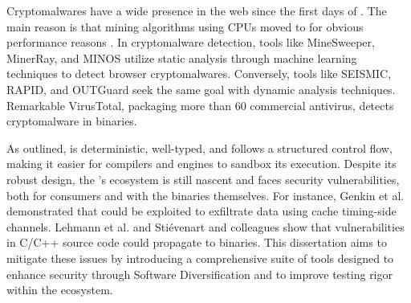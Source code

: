  Cryptomalwares have a wide presence in the web since the first days of \wasm.
The main reason is that mining algorithms using CPUs moved to \wasm for obvious performance reasons \cite{musch2019new}. 
In cryptomalware detection, tools like MineSweeper\cite{Minesweeper}, MinerRay\cite{MinerRay}, and MINOS\cite{MINOS} utilize static analysis through machine learning techniques to detect browser cryptomalwares. 
Conversely, tools like SEISMIC\cite{SEISMIC}, RAPID\cite{RAPID}, and OUTGuard\cite{outguard} seek the same goal with dynamic analysis techniques.
Remarkable VirusTotal, packaging more than 60 commercial antivirus, detects cryptomalware in \wasm binaries.






As outlined, \Wasm is deterministic, well-typed, and follows a structured control flow, making it easier for compilers and engines to sandbox its execution\cite{WebAssemblySecurity}. 
Despite its robust design, the \Wasm's ecosystem is still nascent and faces security vulnerabilities, both for \Wasm consumers and with the \Wasm binaries themselves. 
For instance, Genkin et al. demonstrated that \Wasm could be exploited to exfiltrate data using cache timing-side channels\cite{Genkin2018DrivebyKC}. 
Lehmann et al. and Stiévenart and colleagues show that vulnerabilities in C/C++ source code could propagate to \Wasm binaries\cite{usenixWasm2020, DeRoover2022}.
This dissertation aims to mitigate these issues by introducing a comprehensive suite of tools designed to enhance \Wasm security through Software Diversification and to improve testing rigor within the ecosystem.

